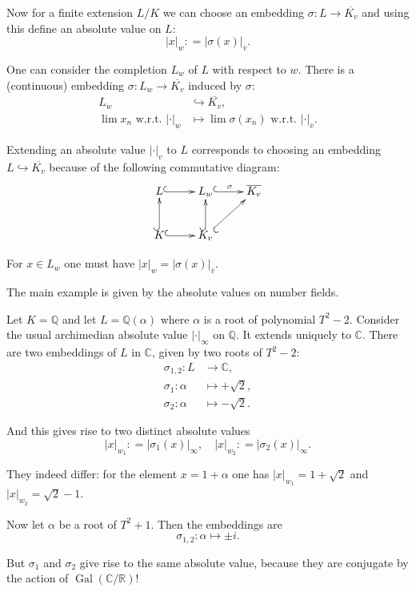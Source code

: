\documentclass{article}
\newcommand{\dfn}{\mathrel{\mathop:}=}
\newcommand{\QQ}{\mathbb{Q}}
\DeclareMathOperator{\Gal}{Gal}
\newcommand{\examplesymbol}{$\blacktriangle$}
\renewcommand{\qedsymbol}{$\blacksquare$}
\theoremstyle{myplain}
\theoremstyle{mydefinition}
\newenvironment{example}
  {\pushQED{\qed}\renewcommand{\qedsymbol}{\examplesymbol}\examplex}
  {\popQED\endexamplex}
\begin{document}
Now for a finite extension $L/K$ we can choose an embedding
$\sigma\colon L \to \overline{K_v}$ and using this define an absolute value on
$L$:
$$|x|_w \dfn |\sigma (x)|_{\overline{v}}.$$

One can consider the completion $L_w$ of $L$ with respect to $w$. There is a
(continuous) embedding $\sigma\colon L_w \to \overline{K_v}$ induced by
$\sigma$:
\begin{align*}
  L_w & \hookrightarrow \overline{K_v}, \\
  \lim x_n \text{ w.r.t. } |\cdot|_w & \mapsto \lim \sigma (x_n) \text{ w.r.t. } |\cdot|_{\overline{v}}.
\end{align*}

Extending an absolute value $|\cdot|_v$ to $L$ corresponds to choosing an
embedding $L \hookrightarrow \overline{K_v}$ because of the following
commutative diagram:
\[ \xymatrix{
    L\ar@{^(->}[r] & L_w \ar@{^(->}[r]^{\sigma} & \overline{K_v} \\
    K \ar@{^(->}[r]\ar@{^(->}[u] & K_v\ar@{^(->}[u]\ar@{_(->}[ur]
  } \]

For $x \in L_w$ one must have $|x|_w = |\sigma (x)|_{\overline{v}}$.

\begin{example}
  The main example is given by the absolute values on number fields.

  Let $K = \QQ$ and let $L = \QQ (\alpha)$ where $\alpha$ is a root of
  polynomial $T^2 - 2$. Consider the usual archimedian absolute value
  $|\cdot|_\infty$ on $\QQ$. It extends uniquely to $\mathbb{C}$. There are two
  embeddings of $L$ in $\mathbb{C}$, given by two roots of $T^2 - 2$:
  \begin{align*}
    \sigma_{1,2}\colon L & \to \mathbb{C}, \\
    \sigma_1\colon \alpha & \mapsto + \sqrt{2}, \\
    \sigma_2\colon \alpha & \mapsto - \sqrt{2}.
  \end{align*}

  And this gives rise to two distinct absolute values
  $$|x|_{w_1} \dfn |\sigma_1 (x)|_\infty, \quad |x|_{w_2} \dfn |\sigma_2 (x)|_\infty.$$

  They indeed differ: for the element $x = 1 + \alpha$ one has
  $|x|_{w_1} = 1 + \sqrt{2}$ and $|x|_{w_2} = \sqrt{2} - 1$.

  \vspace{1em}

  Now let $\alpha$ be a root of $T^2 + 1$. Then the embeddings are
  $$\sigma_{1,2}\colon \alpha \mapsto \pm i.$$

  But $\sigma_1$ and $\sigma_2$ give rise to the same absolute value, because
  they are conjugate by the action of $\Gal (\mathbb{C}/\mathbb{R})$!
\end{example}
\end{document}
